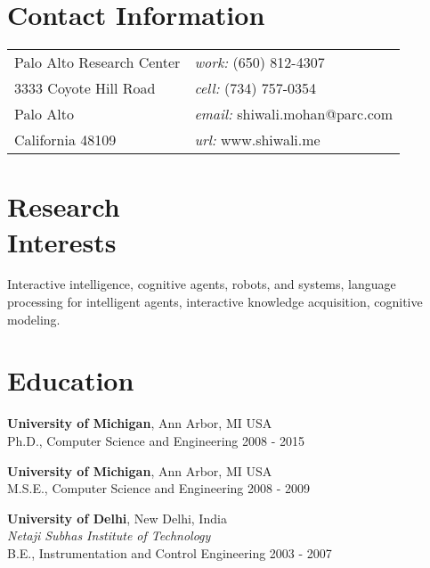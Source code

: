 \documentclass[margin,line,11pt]{res}
\begin{document}

\thispagestyle{empty}
\begin{resume}
  \section{\sc Contact Information}
  \vspace{.05in}
  \begin{tabular}{@{}p{3in}p{4in}}
    Palo Alto Research Center             & {\it work:}  (650) 812-4307 \\            
    3333 Coyote Hill Road                  & {\it cell:}    (734) 757-0354 \\         
    Palo Alto                            & {\it email:}  shiwali.mohan@parc.com\\       
    California 48109                          & {\it url:} www.shiwali.me \\     
  \end{tabular}


  \section{\sc Research \\Interests}
  Interactive intelligence, cognitive agents, robots, and systems,
  language processing for intelligent agents, interactive knowledge
  acquisition, cognitive modeling. 

  \section{\sc Education}
          {\bf University of Michigan}, Ann Arbor, MI USA\\
          Ph.D., Computer Science and Engineering \hfill 2008 - 2015

          {\bf University of Michigan}, Ann Arbor, MI USA\\
          M.S.E., Computer Science and Engineering \hfill 2008 - 2009

          {\bf University of Delhi}, New Delhi, India\\
          {\em Netaji Subhas Institute of Technology}\\
          B.E.,  Instrumentation and Control Engineering \hfill 2003 - 2007


\end{resume}
\end{document}
